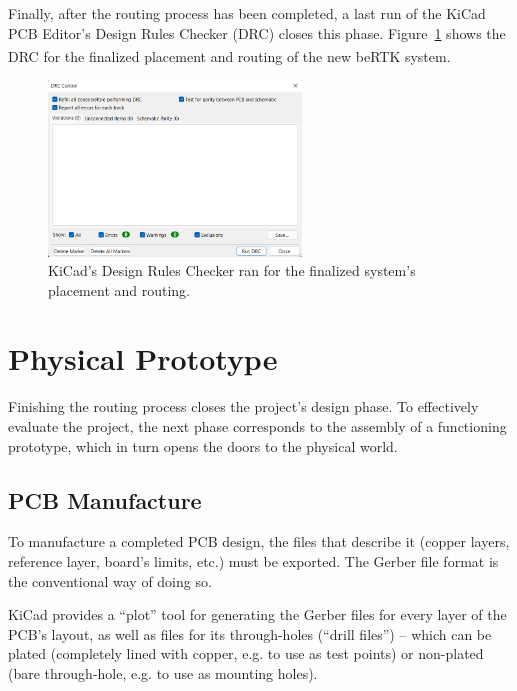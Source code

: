 Finally, after the routing process has been completed, a last run of the KiCad PCB Editor's Design Rules Checker (DRC) closes this phase. Figure~\ref{fig:DRC_errors} shows the DRC for the finalized placement and routing of the new beRTK\textsuperscript{\textregistered} system.

\begin{figure}[h]
	\centering
	\includegraphics[width=0.6\textwidth]{Chapters/Figures/chapter5/DRC.png}
	\caption{KiCad's Design Rules Checker ran for the finalized system's placement and routing.}
	\label{fig:DRC_errors}
\end{figure}


\section{Physical Prototype}\label{sec:53_Prototype}

Finishing the routing process closes the project's design phase. To effectively evaluate the project, the next phase corresponds to the assembly of a functioning prototype, which in turn opens the doors to the physical world.

\subsection{PCB Manufacture}\label{sec:531_PCBmanufacture}

To manufacture a completed PCB design, the files that describe it (copper layers, reference layer, board's limits, etc.) must be exported. The Gerber file format is the conventional way of doing so.

KiCad provides a ``plot'' tool for generating the Gerber files for every layer of the PCB's layout, as well as files for its through-holes (``drill files'') -- which can be plated (completely lined with copper, e.g. to use as test points) or non-plated (bare through-hole, e.g. to use as mounting holes).

